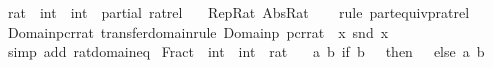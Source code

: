 \begin{isabellebody}
\endisatagproof
{\isafoldproof}%
%
\isadelimproof
\isanewline
%
\endisadelimproof
\isanewline
{}\isamarkupfalse%
\ rat\ {\isacharequal}{\kern0pt}\ {\isachardoublequoteopen}int\ {\isasymtimes}\ int{\isachardoublequoteclose}\ {\isacharslash}{\kern0pt}\ partial{\isacharcolon}{\kern0pt}\ {\isachardoublequoteopen}ratrel{\isachardoublequoteclose}\isanewline
\ \ \ Rep{\isacharunderscore}{\kern0pt}Rat\ Abs{\isacharunderscore}{\kern0pt}Rat\isanewline
%
\isadelimproof
\ \ %
\endisadelimproof
%
\isatagproof
{}\isamarkupfalse%
\ {\isacharparenleft}{\kern0pt}rule\ part{\isacharunderscore}{\kern0pt}equivp{\isacharunderscore}{\kern0pt}ratrel{\isacharparenright}{\kern0pt}%
\endisatagproof
{\isafoldproof}%
%
\isadelimproof
\isanewline
%
\endisadelimproof
\isanewline
{}\isamarkupfalse%
\ Domainp{\isacharunderscore}{\kern0pt}cr{\isacharunderscore}{\kern0pt}rat\ {\isacharbrackleft}{\kern0pt}transfer{\isacharunderscore}{\kern0pt}domain{\isacharunderscore}{\kern0pt}rule{\isacharbrackright}{\kern0pt}{\isacharcolon}{\kern0pt}\ {\isachardoublequoteopen}Domainp\ pcr{\isacharunderscore}{\kern0pt}rat\ {\isacharequal}{\kern0pt}\ {\isacharparenleft}{\kern0pt}{\isasymlambda}x{\isachardot}{\kern0pt}\ snd\ x\ {\isasymnoteq}\ {}{\isacharparenright}{\kern0pt}{\isachardoublequoteclose}\isanewline
%
\isadelimproof
\ \ %
\endisadelimproof
%
\isatagproof
{}\isamarkupfalse%
\ {\isacharparenleft}{\kern0pt}simp\ add{\isacharcolon}{\kern0pt}\ rat{\isachardot}{\kern0pt}domain{\isacharunderscore}{\kern0pt}eq{\isacharparenright}{\kern0pt}%
\endisatagproof
{\isafoldproof}%
%
\isadelimproof
%
\endisadelimproof
%
\isadelimdocument
%
\endisadelimdocument
%
\isatagdocument
%
\isamarkuptrue%
%
\endisatagdocument
{\isafolddocument}%
%
\isadelimdocument
%
\endisadelimdocument
{}\isamarkupfalse%
\ Fract\ {\isacharcolon}{\kern0pt}{\isacharcolon}{\kern0pt}\ {\isachardoublequoteopen}int\ {\isasymRightarrow}\ int\ {\isasymRightarrow}\ rat{\isachardoublequoteclose}\isanewline
\ \ \ {\isachardoublequoteopen}{\isasymlambda}a\ b{\isachardot}{\kern0pt}\ if\ b\ {\isacharequal}{\kern0pt}\ {}\ then\ {\isacharparenleft}{\kern0pt}{}{\isacharcomma}{\kern0pt}\ {}{\isacharparenright}{\kern0pt}\ else\ {\isacharparenleft}{\kern0pt}a{\isacharcomma}{\kern0pt}\ b{\isacharparenright}{\kern0pt}{\isachardoublequoteclose}\isanewline
%
\isadelimproof

\end{isabellebody}
